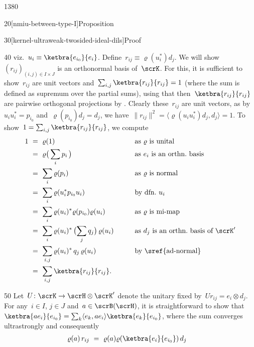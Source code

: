 \begin{parsec}{1380}
\begin{point}{20}[nmiu-between-type-I]{Proposition}
\begin{point}{30}[kernel-ultraweak-twosided-ideal-dils]{Proof}
\begin{point}{40}
                viz.~$u_i \equiv \ketbra{e_{i_0}}{e_i}$.
    Define~$r_{ij} \equiv \varrho(u_i^*) d_j$.
We will show~$(r_{ij})_{(i,j) \in I\times J}$ is an orthonormal
    basis of~$\scrK$.
For this, it is sufficient to
    show~$r_{ij}$ are unit vectors
    and~$\sum_{i,j} \ketbra{r_{ij}}{r_{ij}} = 1$
    (where the sum is defined as supremum over the partial sums),
    using that then~$\ketbra{r_{ij}}{r_{ij}}$
        are pairwise orthogonal projections
        by .
Clearly these~$r_{ij}$ are unit vectors,
     as by~$u_iu_i^* = p_{i_0}$
        and~$\varrho(p_{i_0}) d_j = d_j$,
        we have~$\|r_{ij}\|^2 = \langle \varrho(u_i u_i^*) d_j,d_j\rangle = 1$.
To show~$1 = \sum_{i,j} \ketbra{r_{ij}}{r_{ij}}$, we compute
\begingroup\allowdisplaybreaks
    \begin{alignat*}{2}
    1 
    & \ = \  \varrho(1)
            &\qquad&\text{as $\varrho$ is unital} \\
    & \ = \  \varrho\bigl( \,\sum_i p_i \,\bigr)
            &&\text{as $e_i$ is an orthn.~basis}\\
        & \ = \  \sum_i \varrho(p_i) &&\text{as $\varrho$ is normal}\\
        & \ = \  \sum_i \varrho(u_i^* p_{i_0} u_i) && \text{by dfn.~$u_i$}\\
    & \ = \  \sum_i \varrho(u_i)^* \varrho(p_{i_0}) \varrho(u_i) 
            && \text{as~$\varrho$ is mi-map}\\
    & \ = \  \sum_i \varrho(u_i)^* \,\bigl( \sum_j q_j \bigr) \, \varrho(u_i)
            && \text{as $d_j$ is an orthn.~basis of~$\scrK'$}
        \\
    & \ = \  \sum_{i,j} \varrho(u_i)^*  \,q_j\, \varrho(u_i) 
            && \text{by \sref{ad-normal}}\\
        & \ = \  \sum_{i,j} \ketbra{r_{ij}}{r_{ij}}.
\end{alignat*}
\endgroup
\end{point}
\begin{point}{50}%
Let~$U \colon \scrK \to \scrH \otimes \scrK'$
    denote the unitary fixed by~$U r_{ij} = e_i \otimes d_j$.
For any~$i\in I$, $j \in J$ and~$a\in\scrB(\scrH)$,
    it is straightforward to show that~$\ketbra{a e_i}{e_{i_0}}
                    = \sum_k \langle e_k, ae_i \rangle \ketbra{e_k}{e_{i_0}}$,
        where the sum converges ultrastrongly
        and consequently
\begingroup\allowdisplaybreaks
\begin{align*}
    \varrho(a)\, r_{ij}
        & \ = \ \varrho(a) \varrho(\ketbra{e_i}{e_{i_0}}) \,d_j 

\end{align*}
\end{point}
\end{point}
\end{point}
\end{parsec}
